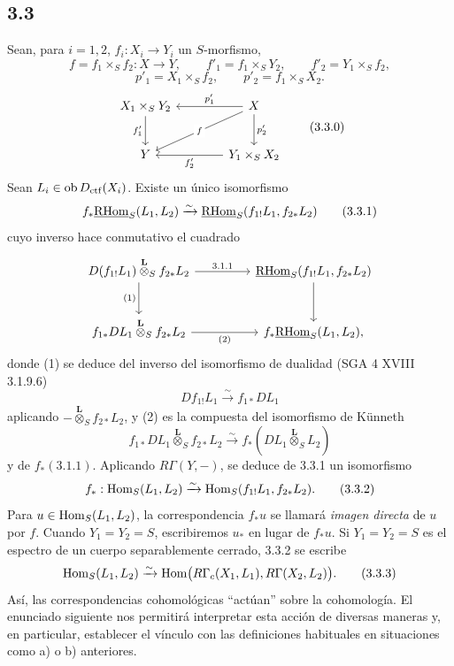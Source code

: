 \subsection*{3.3}
Sean, para $i=1,2$, $f_i:X_i\to Y_i$ un $S$-morfismo,
\[
f=f_1\times_S f_2:X\to Y,
\qquad
f'_1=f_1\times_S Y_2,
\qquad
f'_2=Y_1\times_S f_2,
\]
\[
p'_1=X_1\times_S f_2,
\qquad
p'_2=f_1\times_S X_2.
\]
\begin{equation}
\begin{tikzcd}[column sep=3.8em,row sep=2.4em]
X_1\times_S Y_2 \arrow[d,"f'_1"'] & X \arrow[l,"p'_1"'] \arrow[dl,"f" description] \arrow[d,"p'_2"] \\
Y & Y_1\times_S X_2 \arrow[l,"f'_2"]
\end{tikzcd}
\tag{3.3.0}
\end{equation}
Sean $L_i\in\operatorname{ob}D_{\mathrm{ctf}}(X_i)$. Existe un único isomorfismo
\begin{equation}
f_*\underline{\mathrm{RHom}}_S(L_1,L_2)
\xrightarrow{\sim}
\underline{\mathrm{RHom}}_S(f_{1!}L_1,f_{2*}L_2)
\tag{3.3.1}
\end{equation}
cuyo inverso hace conmutativo el cuadrado
\[
\begin{tikzcd}[column sep=4.5em,row sep=2.6em]
D(f_{1!}L_1)\overset{\mathbf L}{\otimes}_S f_{2*}L_2
  \arrow[r,"3.1.1"] \arrow[d,"(1)"']
& \uRHom_S(f_{1!}L_1,f_{2*}L_2) \arrow[d] \\
f_{1*}DL_1\overset{\mathbf L}{\otimes}_S f_{2*}L_2
  \arrow[r,"(2)"']
& f_*\uRHom_S(L_1,L_2),
\end{tikzcd}
\]
donde (1) se deduce del inverso del isomorfismo de dualidad (SGA 4 XVIII 3.1.9.6)
\[
Df_{1!}L_1\xrightarrow{\sim}f_{1*}DL_1
\]
aplicando $-\overset{\mathbf L}{\otimes}_S f_{2*}L_2$, y (2) es la compuesta del isomorfismo de Künneth
\[
f_{1*}DL_1\overset{\mathbf L}{\otimes}_S f_{2*}L_2
\xrightarrow{\sim}
f_*(DL_1\overset{\mathbf L}{\otimes}_S L_2)
\]
y de $f_*(3.1.1)$. Aplicando $R\Gamma(Y,-)$, se deduce de 3.3.1 un isomorfismo
\begin{equation}
f_*:\operatorname{Hom}_S(L_1,L_2)
\xrightarrow{\sim}
\operatorname{Hom}_S(f_{1!}L_1,f_{2*}L_2).
\tag{3.3.2}
\end{equation}
Para $u\in\operatorname{Hom}_S(L_1,L_2)$, la correspondencia $f_*u$ se llamará \emph{imagen directa} de $u$ por $f$. Cuando $Y_1=Y_2=S$, escribiremos $u_*$ en lugar de $f_*u$. Si $Y_1=Y_2=S$ es el espectro de un cuerpo separablemente cerrado, 3.3.2 se escribe
\begin{equation}
\operatorname{Hom}_S(L_1,L_2)
\xrightarrow{\sim}
\operatorname{Hom}\bigl(R\Gamma_c(X_1,L_1),R\Gamma(X_2,L_2)\bigr).
\tag{3.3.3}
\end{equation}
Así, las correspondencias cohomológicas ``actúan'' sobre la cohomología. El enunciado siguiente nos permitirá interpretar esta acción de diversas maneras y, en particular, establecer el vínculo con las definiciones habituales en situaciones como a) o b) anteriores.

